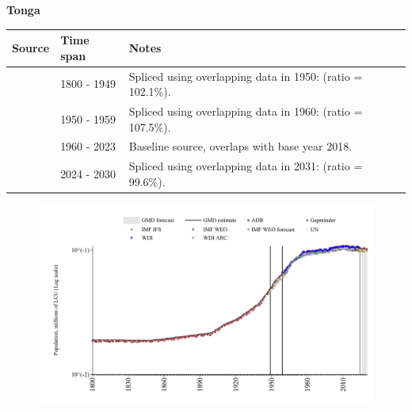\documentclass[12pt,a4paper,landscape]{article}
\begin{document}
\begin{adjustbox}{max totalsize={\paperwidth}{\paperheight},center}
\begin{minipage}[t][\textheight][t]{\textwidth}
\vspace*{0.5cm}
{}
\begin{center}
{\Large\bfseries Tonga}
\end{center}
\vspace{0.5cm}
\begin{table}[H]
\centering
\small
\begin{tabular}{|l|l|l|}
\hline
\textbf{Source} & \textbf{Time span} & \textbf{Notes} \\
\hline
\rowcolor{white}\cite{Gapminder}& 1800 - 1949 &Spliced using overlapping data in 1950: (ratio = 102.1\%).\\
\rowcolor{lightgray}\cite{IMF_IFS}& 1950 - 1959 &Spliced using overlapping data in 1960: (ratio = 107.5\%).\\
\rowcolor{white}\cite{WDI}& 1960 - 2023 &Baseline source, overlaps with base year 2018.\\
\rowcolor{lightgray}\cite{Gapminder}& 2024 - 2030 &Spliced using overlapping data in 2031: (ratio = 99.6\%).\\
\hline
\end{tabular}
\end{table}
\begin{figure}[H]
\centering
\includegraphics[width=\textwidth,height=0.6\textheight,keepaspectratio]{graphs/TON_pop.pdf}
\end{figure}
\end{minipage}
\end{adjustbox}
\end{document}

